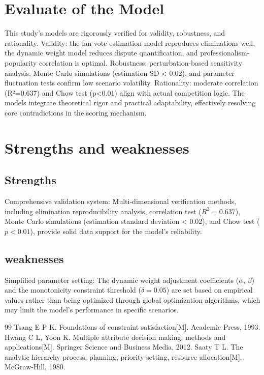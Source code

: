 \documentclass{mcmthesis}
\begin{document}
\section{Evaluate of the Model}
This study’s models are rigorously verified for validity, robustness, and rationality. Validity: the fan vote estimation model reproduces eliminations well, the dynamic weight model reduces dispute quantification, and professionalism-popularity correlation is optimal. Robustness: perturbation-based sensitivity analysis, Monte Carlo simulations (estimation SD < 0.02), and parameter fluctuation tests confirm low scenario volatility. Rationality: moderate correlation (R²=0.637) and Chow test (p<0.01) align with actual competition logic. The models integrate theoretical rigor and practical adaptability, effectively resolving core contradictions in the scoring mechanism.

\section{Strengths and weaknesses}
\subsection{Strengths}
Comprehensive validation system: Multi-dimensional verification methods, including elimination reproducibility analysis, correlation test ($R^2=0.637$), Monte Carlo simulations (estimation standard deviation < 0.02), and Chow test ($p<0.01$), provide solid data support for the model's reliability.
\subsection{weaknesses}
Simplified parameter setting: The dynamic weight adjustment coefficients ($\alpha$, $\beta$) and the monotonicity constraint threshold ($\delta=0.05$) are set based on empirical values rather than being optimized through global optimization algorithms, which may limit the model's performance in specific scenarios.


\begin{thebibliography}{99}
 Tsang E P K. Foundations of constraint satisfaction[M]. Academic Press, 1993. 
 Hwang C L, Yoon K. Multiple attribute decision making: methods and applications[M]. Springer Science and Business Media, 2012. 
 Saaty T L. The analytic hierarchy process: planning, priority setting, resource allocation[M]. McGraw-Hill, 1980. 
\end{thebibliography}
\end{document}
